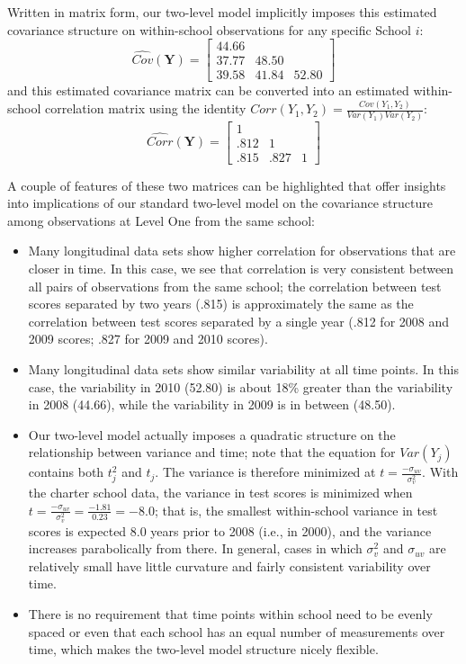 \documentclass[
]{krantz}
\providecommand{\tightlist}{%
  \setlength{\itemsep}{0pt}\setlength{\parskip}{0pt}}
\begin{document}
Written in matrix form, our two-level model implicitly imposes this estimated covariance structure on within-school observations for any specific School \(i\):
\[ \hat{Cov}(\mathbf{Y}) =  \left[
          \begin{array}{cccc}
            44.66 & &   \\
            37.77 & 48.50 &  \\
            39.58 & 41.84 & 52.80
          \end{array} \right] \]
and this estimated covariance matrix can be converted into an estimated within-school correlation matrix using the identity \(Corr(Y_{1},Y_{2})=\frac{Cov(Y_{1},Y_{2})}{Var(Y_{1}) Var(Y_{2})}\):
\[ \hat{Corr}(\mathbf{Y}) =  \left[
          \begin{array}{cccc}
            1 & &   \\
            .812 & 1 &  \\
            .815 & .827 & 1
          \end{array} \right] \]

A couple of features of these two matrices can be highlighted that offer insights into implications of our standard two-level model on the covariance structure among observations at Level One from the same school:

\begin{itemize}
\tightlist
\item
  Many longitudinal data sets show higher correlation for observations that are closer in time. In this case, we see that correlation is very consistent between all pairs of observations from the same school; the correlation between test scores separated by two years (.815) is approximately the same as the correlation between test scores separated by a single year (.812 for 2008 and 2009 scores; .827 for 2009 and 2010 scores).
\item
  Many longitudinal data sets show similar variability at all time points. In this case, the variability in 2010 (52.80) is about 18\% greater than the variability in 2008 (44.66), while the variability in 2009 is in between (48.50).
\item
  Our two-level model actually imposes a quadratic structure on the relationship between variance and time; note that the equation for \(Var(Y_{j})\) contains both \(t^{2}_{j}\) and \(t_{j}\). The variance is therefore minimized at \(t=\frac{-\sigma_{uv}}{\sigma^{2}_{v}}\). With the charter school data, the variance in test scores is minimized when \(t=\frac{-\sigma_{uv}}{\sigma^{2}_{v}}=\frac{-1.81}{0.23}=-8.0\); that is, the smallest within-school variance in test scores is expected 8.0 years prior to 2008 (i.e., in 2000), and the variance increases parabolically from there. In general, cases in which \(\sigma^{2}_{v}\) and \(\sigma_{uv}\) are relatively small have little curvature and fairly consistent variability over time.
\item
  There is no requirement that time points within school need to be evenly spaced or even that each school has an equal number of measurements over time, which makes the two-level model structure nicely flexible.
\end{itemize}
\end{document}
